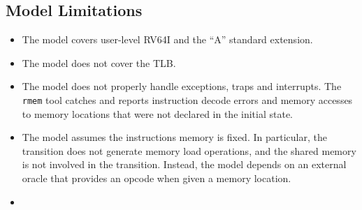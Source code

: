 \subsection{Model Limitations}\label{sec:omm:limitations}
\begin{itemize}
\item The model covers user-level RV64I and the ``A'' standard extension.
\item The model does not cover the TLB.
\item The model does not properly handle exceptions, traps and interrupts.
The {\tt rmem} tool catches and reports instruction decode errors and memory accesses to memory locations that were not declared in the initial state.
\item The model assumes the instructions memory is fixed.
In particular, the  transition does not generate memory load operations, and the shared memory is not involved in the transition.
Instead, the model depends on an external oracle that provides an opcode when given a memory location.
\item {}
\end{itemize}

